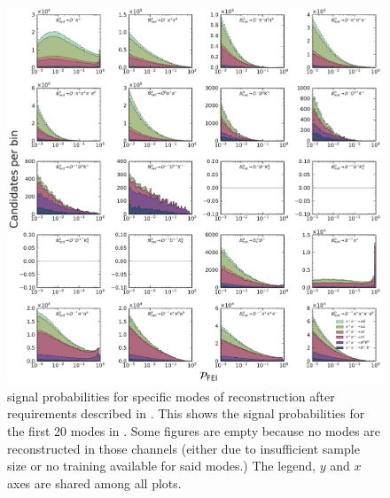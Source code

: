\begin{figure}[htbp!]
    \centering
    \includegraphics[width=1\textwidth]{figures/appendices/FEI_signal_probabilities/Bz_feiSigProbs1.pdf}
    \caption{\label{fig:feisigprobs3} \FEI signal probabilities for specific modes of \Bz reconstruction after requirements described in .
    This shows the signal probabilities for the first 20 \Bz modes in .
    Some figures are empty because no modes are reconstructed in those channels (either due to insufficient sample size or no training available for said modes.)
    The legend, $y$ and $x$ axes are shared among all plots.
    }
\end{figure}

